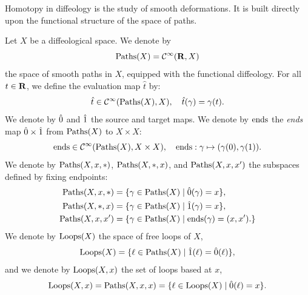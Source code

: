 \documentclass[10pt,reqno,letterpaper,twoside]{amsbook}
\begin{document}
  \begin{article}
    Homotopy in diffeology is the study of smooth deformations.
    It is built directly upon the functional structure of the space of paths.
    
    Let $X$ be a diffeological space.
    We denote by
    $$
      \operatorname{Paths}(X) = {\mathcal{C}}^\infty({\mathbf{R}},X)
      $$%
    the space of smooth paths in $X$,
    equipped with the functional diffeology.
    For all $t \in {\mathbf{R}}$,
    we define the evaluation map $\hat t$ by:
    $$
      \hat t \in {\mathcal{C}}^\infty(\operatorname{Paths}(X), X),
      \quad
      \hat t(\gamma) = \gamma(t).
      $$%
    We denote by $\hat 0$ and $\hat 1$ the source and target maps.
    We denote by $\operatorname{ends}$ the \emph{ends} map $\hat 0 \times \hat 1$ from $\operatorname{Paths}(X)$ to $X \times X$:
    $$
      \operatorname{ends} \in {\mathcal{C}}^\infty(\operatorname{Paths}(X), X \times X),
      \quad
      \operatorname{ends} : \gamma \mapsto (\gamma(0),\gamma(1)).
      $$%
    We denote by $\operatorname{Paths}(X,x,\ast)$,
    $\operatorname{Paths}(X,\ast,x)$,
    and $\operatorname{Paths}(X,x,x')$ the subspaces defined by fixing endpoints:
    \begin{align*}
      \operatorname{Paths}(X,x,\ast) &= \{ \gamma \in \operatorname{Paths}(X) \mid \hat 0(\gamma) = x \},\\
      \operatorname{Paths}(X,\ast,x) &= \{ \gamma \in \operatorname{Paths}(X) \mid \hat 1(\gamma) = x \},\\
      \operatorname{Paths}(X,x,x') &= \{ \gamma \in \operatorname{Paths}(X) \mid \operatorname{ends}(\gamma) = (x,x'). \}
    \end{align*}
    We denote by $\operatorname{Loops}(X)$ the space of free loops of $X$,
    $$
      \operatorname{Loops}(X) = \{ \ell \in \operatorname{Paths}(X) \mid \hat 1(\ell)=\hat 0(\ell) \},
      $$%
    and we denote by $\operatorname{Loops}(X,x)$ the set of loops based at $x$,
    $$
      \operatorname{Loops}(X,x) = \operatorname{Paths}(X,x,x) = \{ \ell \in \operatorname{Loops}(X) \mid \hat 0(\ell) = x \}.
      $$%
  \end{article}
  
\end{document}
